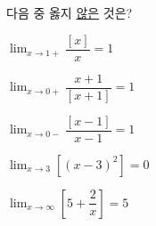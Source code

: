다음 중 옳지 \underline{않은} 것은? 
\begin{choicesii}{\rule[-3ex]{0pt}{8ex}$\displaystyle\lim_{x\to 1+}\dfrac{[x]}{x}=1$}{\rule[-3ex]{0pt}{8ex}$\displaystyle\lim_{x\to 0+}\dfrac{x+1}{[x+1]}=1$}{\rule[-3ex]{0pt}{8ex}$\displaystyle\lim_{x\to 0-}\dfrac{[x-1]}{x-1}=1$}{\rule[-3ex]{0pt}{8ex}$\displaystyle\lim_{x\to 3}[(x-3)^2]=0$}{\rule[-3ex]{0pt}{8ex}$\displaystyle\lim_{x\to\infty}\left[5+\dfrac{2}{x}\right]=5$}\end{choicesii}
